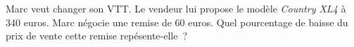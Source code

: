 \documentclass[exercice]{thedocument}%
\begin{document}
%
Marc veut changer son VTT. Le vendeur lui propose le modèle
{\itshape Country XL4} à 340 euros. Marc négocie une remise de 60 euros.
\vskip5pt\noindent Quel pourcentage de baisse du prix de vente cette
remise repésente-elle~?
\end{document}
